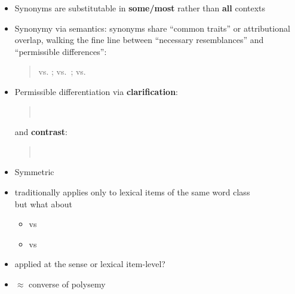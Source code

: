 \documentclass[headrule,footrule]{foils}
\begin{document}
\begin{itemize}
\item Synonyms are substitutable in \textbf{some/most} rather than \textbf{all} contexts
\item Synonymy via semantics: synonyms share ``common traits'' or
  attributional overlap, walking the fine line between ``necessary
  resemblances'' and ``permissible differences'':
  \begin{quote}
       vs. ;   vs.\ ;  vs. 
  \end{quote}
\item Permissible differentiation via \textbf{clarification}:
  \begin{quote}
    \\
  \end{quote}
  and \textbf{contrast}:
  \begin{quote}
    \\
  \end{quote}
\end{itemize}


  \begin{itemize}
  \item Symmetric
  \item traditionally applies only to lexical items of the same word
    class
    \\ but what about
    \begin{itemize}
    \item  {} vs 
    \item {} vs  
    \end{itemize}
  \item applied at the sense or lexical item-level?
  \item $\approx$ converse of polysemy
  \end{itemize}




\end{document}
